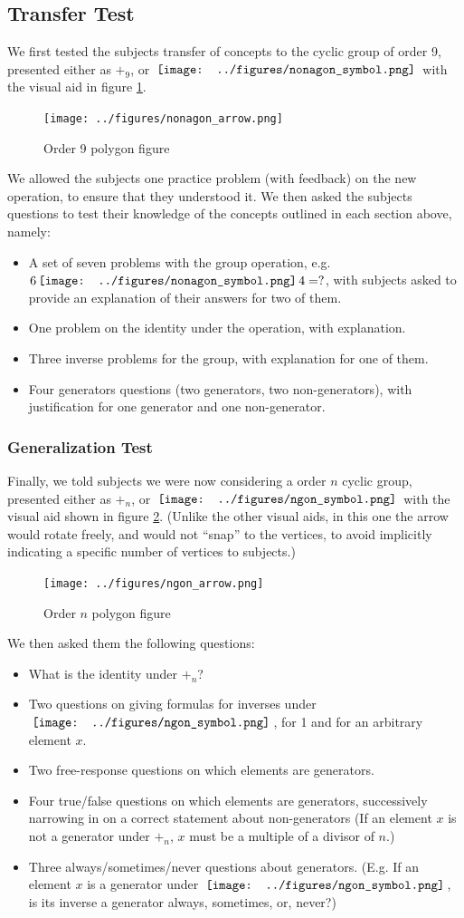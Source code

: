 \documentclass[11pt]{article}
\newcommand{\nonagon}{\,\vcenter{\hbox{\texttt{[image: ../figures/nonagon\_symbol.png]}}}\,}
\newcommand{\ngon}{\,\vcenter{\hbox{\texttt{[image: ../figures/ngon\_symbol.png]}}}\,}
\begin{document}
\subsection{Transfer Test}
We first tested the subjects transfer of concepts to the cyclic group of order 9, presented either as $+_9$, or $\nonagon$ with the visual aid in figure \ref{nonagonex}. 
\begin{figure}[H] \centering \texttt{[image: ../figures/nonagon\_arrow.png]} \caption{Order 9 polygon figure} \label{nonagonex} \end{figure} \noindent
We allowed the subjects one practice problem (with feedback) on the new operation, to ensure that they understood it. We then asked the subjects questions to test their knowledge of the concepts outlined in each section above, namely:
\begin{itemize} 
\item A set of seven problems with the group operation, e.g. $6 \nonagon 4 = ?$, with subjects asked to provide an explanation of their answers for two of them.
\item One problem on the identity under the operation, with explanation.
\item Three inverse problems for the group, with explanation for one of them.
\item Four generators questions (two generators, two non-generators), with justification for one generator and one non-generator.
\end{itemize}
\subsubsection{Generalization Test}
Finally, we told subjects we were now considering a order $n$ cyclic group, presented either as $+_n$, or $\ngon$ with the visual aid shown in figure \ref{ngonex}. (Unlike the other visual aids, in this one the arrow would rotate freely, and would not ``snap'' to the vertices, to avoid implicitly indicating a specific number of vertices to subjects.) 
\begin{figure}[H] \centering \texttt{[image: ../figures/ngon\_arrow.png]} \caption{Order $n$ polygon figure} \label{ngonex} \end{figure} \noindent
We then asked them the following questions: 
\begin{itemize}
\item What is the identity under $+_n$?
\item Two questions on giving formulas for inverses under $\ngon$, for 1 and for an arbitrary element $x$.
\item Two free-response questions on which elements are generators. 
\item Four true/false questions on which elements are generators, successively narrowing in on a correct statement about non-generators (If an element $x$ is not a generator under $+_n$, $x$ must be a multiple of a divisor of $n$.)
\item Three always/sometimes/never questions about generators. (E.g. If an element $x$ is a generator under $\ngon$, is its inverse a generator always, sometimes, or, never?) 
\end{itemize}
\end{document}

